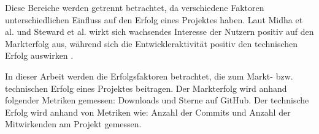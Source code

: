 Diese Bereiche werden getrennt betrachtet, da verschiedene Faktoren unterschiedlichen Einfluss
auf den Erfolg eines Projektes haben.
Laut Midha et al. und Steward et al. wirkt sich wachsendes Interesse der Nutzern positiv auf den
Markterfolg aus, während sich die Entwickleraktivität positiv den technischen Erfolg auswirken
\cite{midhaFactorsAffectingSuccess2012, %
    stewartImpactsLicenseChoice2006a}. %




In dieser Arbeit werden die Erfolgsfaktoren betrachtet, die zum Markt- bzw. technischen Erfolg
eines Projektes beitragen.
Der Markterfolg wird anhand folgender Metriken gemessen:
Downloads und Sterne auf GitHub.
Der technische Erfolg wird anhand von Metriken wie:
Anzahl der Commits und Anzahl der Mitwirkenden am Projekt gemessen.





